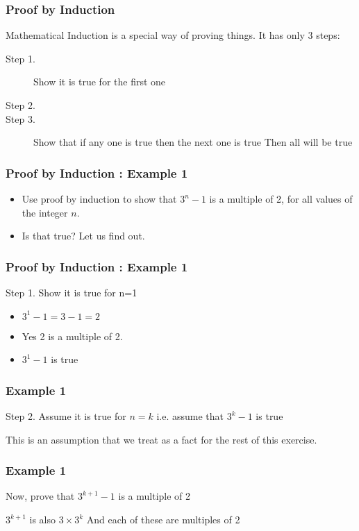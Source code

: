 \documentclass{beamer}
\begin{document}

\begin{frame}

\frametitle{Proof by Induction}

Mathematical Induction is a special way of proving things. It has only 3 steps:

\begin{description}
\item[Step 1.] Show it is true for the first one
\item[Step 2.]
\item[Step 3.] Show that if any one is true then the next one is true
Then all will be true
\end{description}

\end{frame}
\begin{frame}
\frametitle{Proof by Induction : Example 1}
\large
\begin{itemize}
\item Use proof by induction to show that $3^n-1$ is a multiple of 2, for all values of the integer $n$.
\item Is that true? Let us find out.
\end{itemize} 
\end{frame}
\begin{frame}
\frametitle{Proof by Induction : Example 1}
Step 1. Show it is true for n=1

\begin{itemize}
\item $3^1-1 = 3-1 = 2$
\item Yes 2 is a multiple of 2. 
\item $3^1-1$ is true
\end{itemize}

\end{frame}
\begin{frame}
\frametitle{Example 1}

Step 2. Assume it is true for $n=k$ i.e. assume that $3^k-1$ is true

This is an assumption that we treat 
as a fact for the rest of this exercise.


\end{frame}
\begin{frame}
\frametitle{Example 1}
\large
Now, prove that $3^{k+1}-1$ is a multiple of 2
 
 
$3^{k+1}$ is also $3\times3^{k}$
And each of these are multiples of 2
\end{frame}
\end{document}
